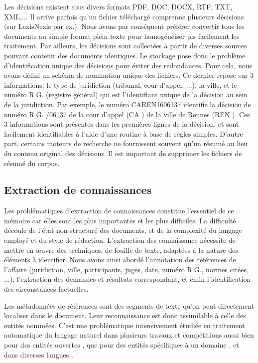 Les décisions existent sous divers formats PDF, DOC, DOCX, RTF, TXT, XML,... Il arrive parfois qu'un fichier téléchargé comprenne plusieurs décisions (sur LexisNexis par ex.). Nous avons par conséquent préférer convertir tous les documents au simple format plein texte pour homogénéiser pls facilement les traitement. Par ailleurs, les décisions sont collectées à partir de diverses sources pouvant contenir des documents identiques. Le stockage pose donc le problème d'identification unique des décisions pour éviter des redondances. Pour cela, nous avons défini un schéma de nomination unique des fichiers. Ce dernier repose sur 3 informations: le type de juridiction (tribunal, cour d'appel, ...), la ville, et le numéro R.G. (registre général) qui est l'identifiant unique de la décision au sein de la juridiction. Par exemple, le numéro \og CAREN1606137 \fg{} identifie la décision de numéro R.G. /06137 \fg{} de la cour d'appel (\og CA \fg{}) de la ville de Rennes (\og REN \fg{}). Ces 3 informations sont présentes dans les premières lignes de la décision, et sont facilement identifiables à l'aide d'une routine à base de règles simples. D'autre part, certains moteurs de recherche ne fournissent souvent qu'un résumé au lieu du contenu original des décisions. Il est important de supprimer les fichiers de résumé du corpus.

\subsection{Extraction de connaissances}
\label{subsec:intro:ie}
Les problématiques d'extraction de connaissances constitue l'essentiel de ce mémoire car elles sont les plus importantes et les plus difficiles. La difficulté découle de l'état non-structuré des documents, et de la complexité du langage employé et du style de rédaction. L'extraction des connaissance nécessite de mettre en \oe uvre des techniques, de fouille de texte, adaptées à la nature des éléments à identifier. Nous avons ainsi abordé l'annotation des références de l'affaire (juridiction, ville, participants, juges, date, numéro R.G., normes citées, ...), l'extraction des demandes et résultats correspondant, et enfin l'identification des circonstances factuelles.

Les métadonnées de références sont des segments de texte qu'on peut directement localiser dans le document. Leur reconnaissance est donc assimilable à celle des entités nommées. C'est une problématique intensivement étudiée en traitement automatique du langage naturel \citep{yadav2018surveyNeuralNER} dans plusieurs travaux et compétitions aussi bien pour des entités ouvertes \citep{tjong2003introCoNLL,grishman1996muc6}, que pour des entités spécifiques à un domaine \citep{kim2004bioNer, persson2012nbbioner,hanisch2005prominer}, et dans diverses langues \citep{li2018wcpbioner,alfred2014malayner,amarappa2015kannada}. 

